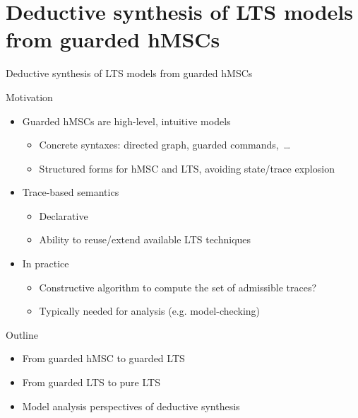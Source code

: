 \section{Deductive synthesis of LTS models from guarded hMSCs}

\begin{frame}{Deductive synthesis of LTS models from guarded hMSCs}

  \begin{block}{Motivation}
    \begin{itemize}
      \item Guarded hMSCs are high-level, intuitive models 
      \begin{itemize}
        \item Concrete syntaxes: directed graph, guarded commands,~\ldots
        \item Structured forms for hMSC and LTS, avoiding state/trace explosion
      \end{itemize}
      \item Trace-based semantics
      \begin{itemize}
        \item Declarative
        \item Ability to reuse/extend available LTS techniques
      \end{itemize}
      \item In practice
      \begin{itemize}
        \item Constructive algorithm to compute the set of admissible traces?
        \item Typically needed for analysis (e.g. model-checking)
      \end{itemize}
    \end{itemize}
  \end{block}

  \begin{block}{Outline}
    \begin{itemize}
      \item From guarded hMSC to guarded LTS
      \item From guarded LTS to pure LTS
      \item Model analysis perspectives of deductive synthesis
    \end{itemize}
  \end{block}

\end{frame}

